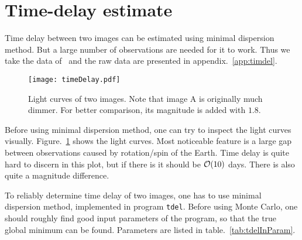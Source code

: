 \clearpage
\section{Time-delay estimate} 
Time delay between two images can be estimated using minimal dispersion method. But a large number of observations are needed for it to work. Thus we take the data of~\cite{vuissoz} and the raw data are presented in appendix.~\ref{app:timdel}.

\begin{figure}[H]
	\centering
	\texttt{[image: timeDelay.pdf]}
	\caption{Light curves of two images. Note that image A is originally much dimmer. For better comparison, its magnitude is added with $1.8$.}%
	\label{fig:timeDelay}
\end{figure}
Before using minimal dispersion method, one can try to inspect the light curves visually. Figure.~\ref{fig:timeDelay} shows the light curves. Most noticeable feature is a large gap between observations caused by rotation/spin of the Earth. Time delay is quite hard to discern in this plot, but if there is it should be $\order{10}$ days. There is also quite a magnitude difference.

To reliably determine time delay of two images, one has to use minimal dispersion method, implemented in program \verb|tdel|. Before using Monte Carlo, one should roughly find good input parameters of the program, so that the true global minimum can be found. Parameters are listed in table.~\ref{tab:tdelInParam}.

